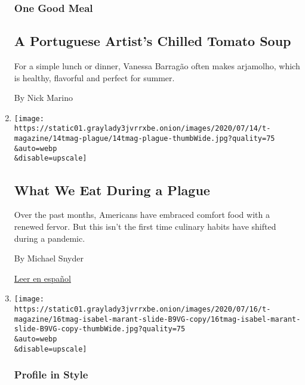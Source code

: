 \begin{enumerate}
  \hypertarget{one-good-meal}{%
  \subsubsection{One Good Meal}\label{one-good-meal}}

  \hypertarget{a-portuguese-artists-chilled-tomato-soup}{%
  \subsection{A Portuguese Artist's Chilled Tomato
  Soup}\label{a-portuguese-artists-chilled-tomato-soup}}

  For a simple lunch or dinner, Vanessa Barragão often makes arjamolho,
  which is healthy, flavorful and perfect for summer.

  By Nick Marino
\item
  \href{/2020/07/16/t-magazine/eating-food-during-plague.html}{}

  \texttt{[image: https://static01.graylady3jvrrxbe.onion/images/2020/07/14/t-magazine/14tmag-plague/14tmag-plague-thumbWide.jpg?quality=75\\\&auto=webp\\\&disable=upscale]}

  \hypertarget{what-we-eat-during-a-plague}{%
  \subsection{What We Eat During a
  Plague}\label{what-we-eat-during-a-plague}}

  Over the past months, Americans have embraced comfort food with a
  renewed fervor. But this isn't the first time culinary habits have
  shifted during a pandemic.

  By Michael Snyder

  \href{https://www.nytimes3xbfgragh.onion/es/2020/07/23/t-magazine/comida-pandemia.html}{Leer
  en español}
\item
  \href{/2020/07/16/t-magazine/isabel-marant.html}{}

  \texttt{[image: https://static01.graylady3jvrrxbe.onion/images/2020/07/16/t-magazine/16tmag-isabel-marant-slide-B9VG-copy/16tmag-isabel-marant-slide-B9VG-copy-thumbWide.jpg?quality=75\\\&auto=webp\\\&disable=upscale]}

  \hypertarget{profile-in-style}{%
  \subsubsection{Profile in Style}\label{profile-in-style}}


\end{enumerate}
